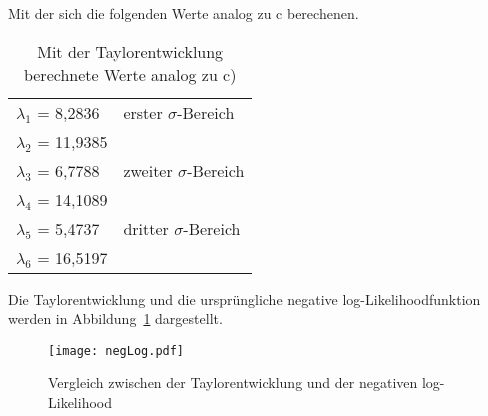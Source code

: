 %
\noindent
Mit der sich die folgenden Werte analog zu c berechenen.
\begin{table}[H]
\centering
\begin{tabular}{ll}
$\lambda_1$ = 8,2836 & erster $\sigma$-Bereich\\
$\lambda_2$ = 11,9385 &\\
$\lambda_3$ = 6,7788 & zweiter $\sigma$-Bereich\\
$\lambda_4$ = 14,1089& \\
$\lambda_5$ = 5,4737 & dritter $\sigma$-Bereich\\
$\lambda_6$ = 16,5197&
\end{tabular}
\caption{Mit der Taylorentwicklung berechnete Werte analog zu c)}
\end{table}
\noindent
Die Taylorentwicklung und die ursprüngliche negative log-Likelihoodfunktion werden in Abbildung~\ref{d} dargestellt.

\begin{figure}[H]
\centering
\texttt{[image: negLog.pdf]}
\caption{Vergleich zwischen der Taylorentwicklung und der negativen log-Likelihood}
\label{d}
\end{figure}
